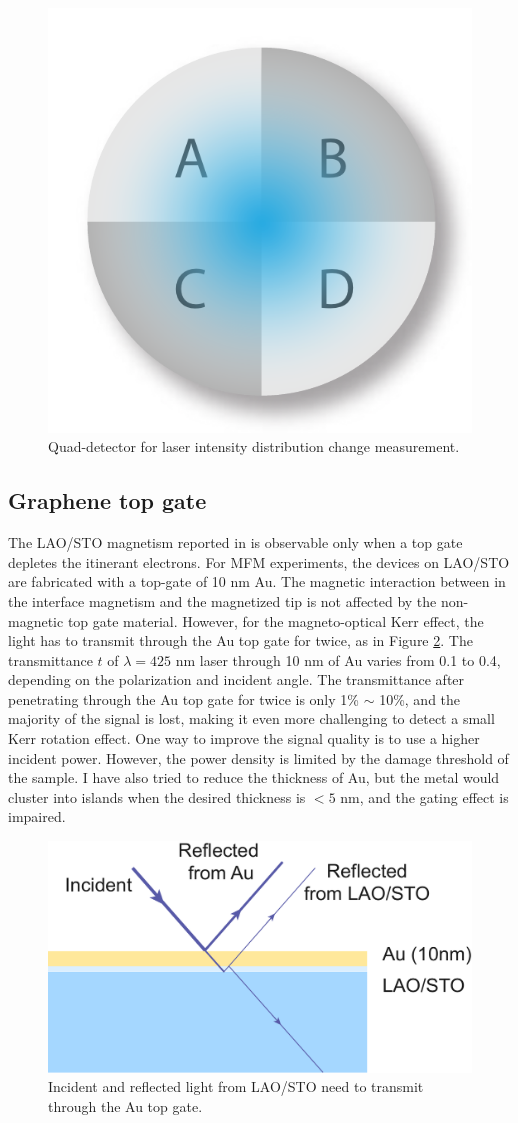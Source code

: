 \documentclass[pdflatex, sectionletters, 12pt]{pittetd}    %
\begin{document}
\begin{figure}[h!]
	\centering
	\includegraphics[width=.25\textwidth]{Drawing/Quad.pdf}
	\caption{Quad-detector for laser intensity distribution change measurement.}
	\label{FIG:Quad}
\end{figure}

\subsection{Graphene top gate}

The LAO/STO magnetism reported in \cite{bi2014room} is observable only when a top gate depletes the itinerant electrons. For MFM experiments, the devices on LAO/STO are fabricated with a top-gate of 10 nm Au. The magnetic interaction between in the interface magnetism and the magnetized tip is not affected by the non-magnetic top gate material. However, for the magneto-optical Kerr effect, the light has to transmit through the Au top gate for twice, as in Figure \ref{FIG:KerrTopGate}. The transmittance $t$ of $\lambda = 425$ nm laser through 10 nm of Au varies from 0.1 to 0.4, depending on the polarization and incident angle\cite{smith1986noble}. The transmittance after penetrating through the Au top gate for twice is only 1\% $\sim$ 10\%, and the majority of the signal is lost, making it even more challenging to detect a small Kerr rotation effect. One way to improve the signal quality is to use a higher incident power. However, the power density is limited by the damage threshold of the sample. I have also tried to reduce the thickness of Au, but the metal would cluster into islands when the desired thickness is $< 5$ nm, and the gating effect is impaired.
\\

\begin{figure}[h!]
	\centering
	\includegraphics[width=.55\textwidth]{Drawing/KerrTopGate.pdf}
	\caption{Incident and reflected light from LAO/STO need to transmit through the Au top gate.}
	\label{FIG:KerrTopGate}
\end{figure}
\end{document}
